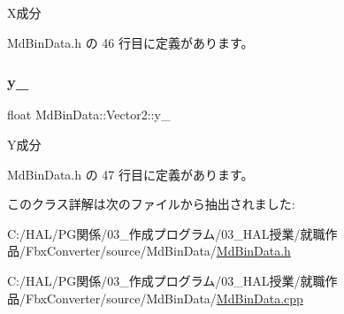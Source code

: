 X成分 



 Md\+Bin\+Data.\+h の 46 行目に定義があります。

\mbox{\label{class_md_bin_data_1_1_vector2_afdd7301e3bb185356463203385c30e1f}} 
\subsubsection{\texorpdfstring{y\+\_\+}{y\_}}
{\footnotesize\ttfamily float Md\+Bin\+Data\+::\+Vector2\+::y\+\_\+\hspace{0.3cm}{\ttfamily [private]}}



Y成分 



 Md\+Bin\+Data.\+h の 47 行目に定義があります。



このクラス詳解は次のファイルから抽出されました\+:\begin{DoxyCompactItemize}
\item 
C\+:/\+H\+A\+L/\+P\+G関係/03\+\_\+作成プログラム/03\+\_\+\+H\+A\+L授業/就職作品/\+Fbx\+Converter/source/\+Md\+Bin\+Data/\mbox{\hyperlink{_md_bin_data_8h}{Md\+Bin\+Data.\+h}}\item 
C\+:/\+H\+A\+L/\+P\+G関係/03\+\_\+作成プログラム/03\+\_\+\+H\+A\+L授業/就職作品/\+Fbx\+Converter/source/\+Md\+Bin\+Data/\mbox{\hyperlink{_md_bin_data_8cpp}{Md\+Bin\+Data.\+cpp}}\end{DoxyCompactItemize}

